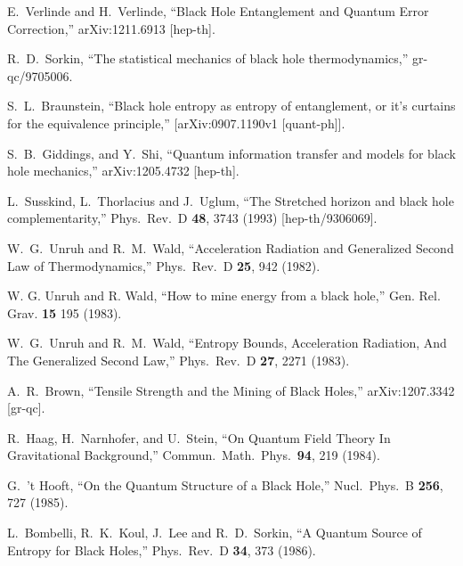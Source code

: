 \documentclass[12pt]{article}
\begin{document}
\begin{thebibliography}{99}
  E.~Verlinde and H.~Verlinde,
  ``Black Hole Entanglement and Quantum Error Correction,''
  arXiv:1211.6913 [hep-th].


  R.~D.~Sorkin,
  ``The statistical mechanics of black hole thermodynamics,''
  gr-qc/9705006.

  S.~L.~Braunstein, ``Black hole entropy as entropy of entanglement, or it's curtains for the equivalence principle,''
  [arXiv:0907.1190v1 [quant-ph]].


  S.~B.~Giddings, and Y.~Shi,
  ``Quantum information transfer and models for black hole mechanics,''
  arXiv:1205.4732 [hep-th].


  L.~Susskind, L.~Thorlacius and J.~Uglum,
  ``The Stretched horizon and black hole complementarity,''
  Phys.\ Rev.\ D {\bf 48}, 3743 (1993)
  [hep-th/9306069].

  W.~G.~Unruh and R.~M.~Wald,
  ``Acceleration Radiation and Generalized Second Law of Thermodynamics,''
  Phys.\ Rev.\ D {\bf 25}, 942 (1982).

W. G. Unruh and R. Wald,
``How to mine energy from a black hole,''
Gen. Rel. Grav. {\bf 15} 195 (1983).

  W.~G.~Unruh and R.~M.~Wald,
  ``Entropy Bounds, Acceleration Radiation, And The Generalized Second Law,''
  Phys.\ Rev.\ D {\bf 27}, 2271 (1983).

  A.~R.~Brown,
  ``Tensile Strength and the Mining of Black Holes,''
  arXiv:1207.3342 [gr-qc].

  R.~Haag, H.~Narnhofer, and U.~Stein,
  ``On Quantum Field Theory In Gravitational Background,''
  Commun.\ Math.\ Phys.\  {\bf 94}, 219 (1984).

  G.~'t Hooft,
  ``On the Quantum Structure of a Black Hole,''
  Nucl.\ Phys.\ B {\bf 256}, 727 (1985).


  L.~Bombelli, R.~K.~Koul, J.~Lee and R.~D.~Sorkin,
  ``A Quantum Source of Entropy for Black Holes,''
  Phys.\ Rev.\ D {\bf 34}, 373 (1986).


\end{thebibliography}
\end{document}
